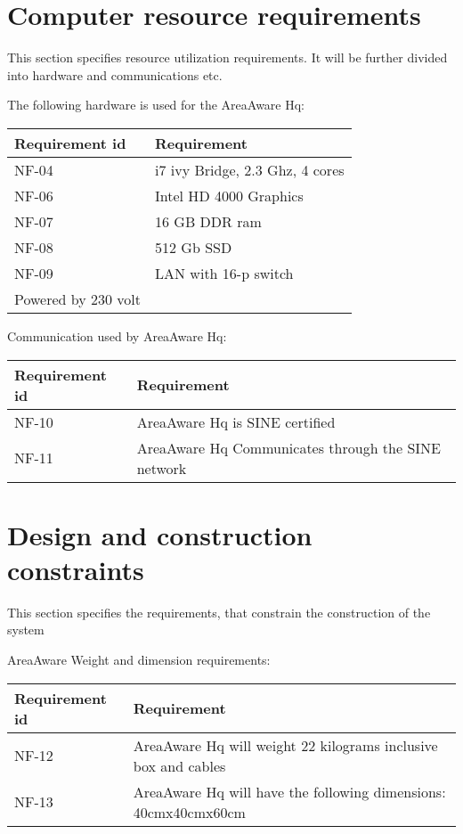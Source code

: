\section{Computer resource requirements}
This section specifies resource utilization requirements. It will be further divided into hardware and communications etc.

The following hardware is used for the AreaAware Hq:
\begin{longtable}{| p{3.2cm} |  p{10cm} | }
	\hline
	\textbf{Requirement id} &  \textbf{Requirement } \\
	\hline
	NF-04 & i7 ivy Bridge, 2.3 Ghz, 4 cores  \\
	\hline
	NF-06 & Intel HD 4000 Graphics  \\
	\hline
	NF-07 & 16 GB DDR ram  \\
	\hline
	NF-08 &512 Gb SSD \\
	\hline
	NF-09 & LAN with 16-p switch  \\
	\hline
	Powered by 230 volt \\
	\hline
\end{longtable}

Communication used by AreaAware Hq:
\begin{longtable}{| p{3.2cm} |  p{10cm} | }
	\hline
	\textbf{Requirement id} &  \textbf{Requirement } \\
	\hline
	NF-10 & AreaAware Hq is SINE certified  \\
	\hline
	NF-11 & AreaAware Hq Communicates through the SINE network \\
	\hline
\end{longtable}





\section{Design and construction constraints}
This section specifies the requirements, that constrain the construction of the system

AreaAware Weight and dimension requirements:
\begin{longtable}{| p{3.2cm} |  p{10cm} | }
	\hline
	\textbf{Requirement id} &  \textbf{Requirement } \\
	\hline
	NF-12 & AreaAware Hq will weight 22 kilograms inclusive box and cables  \\
	\hline
	NF-13 & AreaAware Hq will have the following dimensions: 40cmx40cmx60cm \\
	\hline
\end{longtable}


